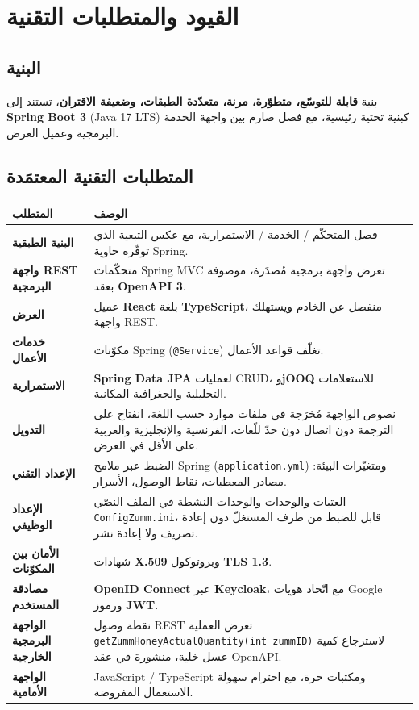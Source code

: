 \chapter{القيود والمتطلبات التقنية}

\section{البنية}
بنية \textbf{قابلة للتوسّع، متطوّرة، مرنة، متعدّدة الطبقات، وضعيفة الاقتران}،
تستند إلى \textbf{Spring Boot 3} (Java 17 LTS) كبنية تحتية رئيسية، مع فصل صارم
بين واجهة الخدمة البرمجية وعميل العرض.

\section{المتطلبات التقنية المعتمَدة}
\begin{xltabular}{\textwidth}{>{\bfseries}p{4cm} X}
\toprule
\textbf{المتطلب} & \textbf{الوصف} \\
\midrule
\endhead
البنية الطبقية & فصل المتحكّم / الخدمة / الاستمرارية، مع عكس التبعية الذي توفّره حاوية Spring. \\
واجهة REST البرمجية & متحكّمات Spring MVC تعرض واجهة برمجية مُصدَرة، موصوفة بعقد \textbf{OpenAPI 3}. \\
العرض & عميل \textbf{React} بلغة \textbf{TypeScript}، منفصل عن الخادم ويستهلك واجهة REST. \\
خدمات الأعمال & مكوّنات Spring (\texttt{@Service}) تغلّف قواعد الأعمال. \\
الاستمرارية & \textbf{Spring Data JPA} لعمليات CRUD، و\textbf{jOOQ} للاستعلامات التحليلية والجغرافية المكانية. \\
التدويل & نصوص الواجهة مُخرَجة في ملفات موارد حسب اللغة، انفتاح على الترجمة دون اتصال دون حدّ للّغات، الفرنسية والإنجليزية والعربية على الأقل في العرض. \\
الإعداد التقني & الضبط عبر ملامح Spring (\texttt{application.yml}) ومتغيّرات البيئة: مصادر المعطيات، نقاط الوصول، الأسرار. \\
الإعداد الوظيفي & العتبات والوحدات والوحدات النشطة في الملف النصّي \texttt{ConfigZumm.ini}، قابل للضبط من طرف المستغلّ دون إعادة تصريف ولا إعادة نشر. \\
الأمان بين المكوّنات & شهادات \textbf{X.509} وبروتوكول \textbf{TLS 1.3}. \\
مصادقة المستخدم & \textbf{OpenID Connect} عبر \textbf{Keycloak}، مع اتّحاد هويات Google ورموز \textbf{JWT}. \\
الواجهة البرمجية الخارجية & نقطة وصول REST تعرض العملية \texttt{getZummHoneyActualQuantity(int zummID)} لاسترجاع كمية عسل خلية، منشورة في عقد OpenAPI. \\
الواجهة الأمامية & JavaScript / TypeScript ومكتبات حرة، مع احترام سهولة الاستعمال المفروضة. \\
\bottomrule
\end{xltabular}

